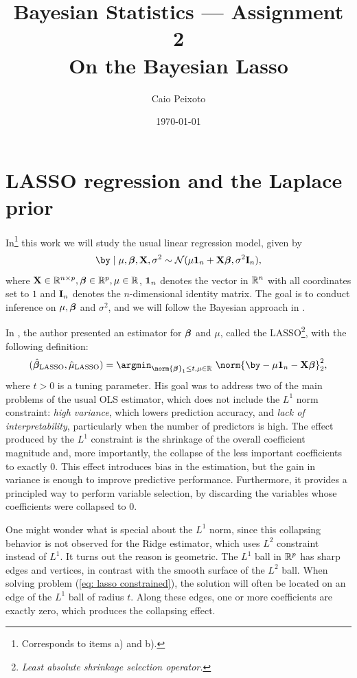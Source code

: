 \documentclass[a4paper, 10pt]{article}
\title{{\Large\bfseries\sffamily Bayesian Statistics --- Assignment 2} \\ \large\sffamily On the Bayesian Lasso}
\author{\normalsize Caio Peixoto}
\date{\normalsize\today}
\begin{document}
\maketitle

\tableofcontents

\section{LASSO regression and the Laplace prior}
In\footnote{Corresponds to items a) and b).} this work we will study the usual linear regression model, given by 
\begin{equation}
    \by \mid \mu, \betabold, \bX, \sigma^2 \sim \Normal(\mu \ones_{ n } +  \bX \betabold, \sigma^2 \eye_n)
    \label{eq: likelihood}
,\end{equation}
where $ \mathbf{X} \in \mathbb{R}^{n \times p}, \boldsymbol{\beta} \in \mathbb{R}^{ p }, \mu \in \mathbb{R} $, $ \bm{1}_{ n } $ denotes the vector in $ \mathbb{R}^{ n } $ with all coordinates set to $ 1 $ and $ \mathbf{I}_{ n } $ denotes the $ n $-dimensional identity matrix.
The goal is to conduct inference on $ \mu, \boldsymbol{\beta} $ and $ \sigma^2 $, and we will follow the Bayesian approach in \cite{parkcasella2008bayesianlasso}.

In \cite{tibshirani1994lasso}, the author presented an estimator for $ \boldsymbol{\beta} $ and $ \mu $, called the LASSO\footnote{\emph{Least absolute shrinkage selection operator.}}, with the following definition:
\begin{equation}
    ( \hat{ \betabold }_{ \lasso }, \hat{ \mu }_{ \lasso } )
    = \argmin_{ \norm{ \betabold }_{ 1 } \leq t, \mu \in \R } \ \norm{\by - \mu \ones_{ n } - \bX \betabold}_2^2
    \label{eq: lasso constrained}
,\end{equation}
where $ t > 0 $ is a tuning parameter.
His goal was to address two of the main problems of the usual OLS estimator, which does not include the $ L^{ 1 } $ norm constraint: \emph{high variance}, which lowers prediction accuracy, and \emph{lack of interpretability}, particularly when the number of predictors is high.
The effect produced by the $ L^1 $ constraint is the shrinkage of the overall coefficient magnitude and, more importantly, the collapse of the less important coefficients to exactly $ 0 $.
This effect introduces bias in the estimation, but the gain in variance is enough to improve predictive performance.
Furthermore, it provides a principled way to perform variable selection, by discarding the variables whose coefficients were collapsed to $ 0 $.

One might wonder what is special about the $ L^1 $ norm, since this collapsing behavior is not observed for the Ridge estimator, which uses $ L^2 $ constraint instead of $ L^1 $.
It turns out the reason is geometric.
The $ L^1 $ ball in $ \mathbb{R}^{ p } $ has sharp edges and vertices, in contrast with the smooth surface of the $ L^2 $ ball.
When solving problem (\ref{eq: lasso constrained}), the solution will often be located on an edge of the $ L^1 $ ball of radius $ t $.
Along these edges, one or more coefficients are exactly zero, which produces the collapsing effect.
\end{document}
